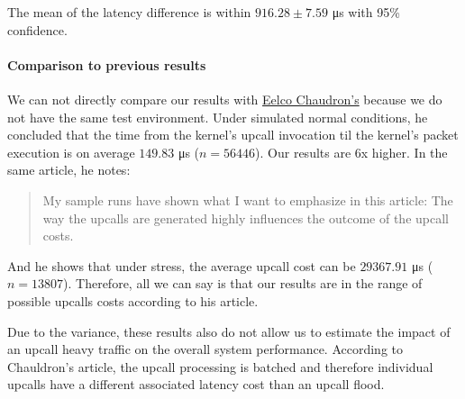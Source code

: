 The mean of the latency difference is within $916.28 \pm 7.59$ \si{\micro\second} with 95\% confidence. 

\paragraph{Comparison to previous results}

We can not directly compare our results with \href{https://developers.redhat.com/articles/2022/02/07/investigating-cost-open-vswitch-upcalls-linux}{Eelco Chaudron's} because we do not have the same test environment. Under simulated normal conditions, he concluded that the time from the kernel's upcall invocation til the kernel's packet execution is on average $149.83$ \si{\micro\second} ($n = 56446$). Our results are 6x higher. In the same article, he notes:

\begin{quote}
My sample runs have shown what I want to emphasize in this article: The way the upcalls are generated highly influences the outcome of the upcall costs.
\end{quote}

And he shows that under stress, the average upcall cost can be $29367.91$ \si{\micro\second} ($n = 13807$). Therefore, all we can say is that our results are in the range of possible upcalls costs according to his article.

Due to the variance, these results also do not allow us to estimate the impact of an upcall heavy traffic on the overall system performance. According to Chauldron's article, the upcall processing is batched and therefore individual upcalls have a different associated latency cost than an upcall flood.

